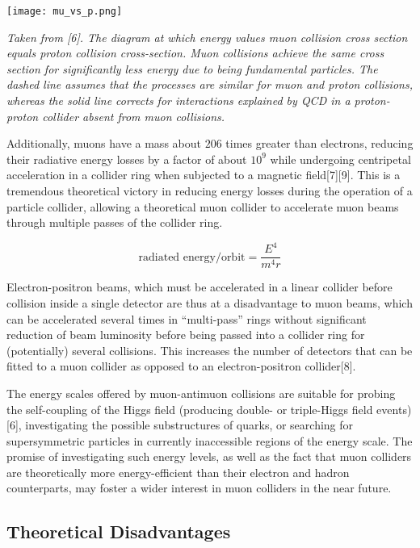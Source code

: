 \documentclass{article}
\begin{document}
	\begin{center}
		\texttt{[image: mu\_vs\_p.png]}
		\par \textit{Taken from [6]. The diagram at which energy values muon collision cross section equals proton collision cross-section. Muon collisions achieve the same cross section for significantly less energy due to being fundamental particles. The dashed line assumes that the processes are similar for muon and proton collisions, whereas the solid line corrects for interactions explained by QCD in a proton-proton collider absent from muon collisions.}
	\end{center}	
	
	
	\par Additionally, muons have a mass about $206$ times greater than electrons, reducing their radiative energy losses by a factor of about $10^{9}$ while undergoing centripetal acceleration in a collider ring when subjected to a magnetic field[7][9]. This is a tremendous theoretical victory in reducing energy losses during the operation of a particle collider, allowing a theoretical muon collider to accelerate muon beams through multiple passes of the collider ring. 
	
	$$\textrm{radiated energy/orbit} = \frac{E^4}{m^4r}$$
	
	\par Electron-positron beams, which must be accelerated in a linear collider before collision inside a single detector are thus at a disadvantage to muon beams, which can be accelerated several times in “multi-pass” rings without significant reduction of beam luminosity before being passed into a collider ring for (potentially) several collisions. This increases the number of detectors that can be fitted to a muon collider as opposed to an electron-positron collider[8].
	\par The energy scales offered by muon-antimuon collisions are suitable for probing the self-coupling of the Higgs field (producing double- or triple-Higgs field events)[6], investigating the possible substructures of quarks, or searching for supersymmetric particles in currently inaccessible regions of the energy scale. The promise of investigating such energy levels, as well as the fact that muon colliders are theoretically more energy-efficient than their electron and hadron counterparts, may foster a wider interest in muon colliders in the near future.
	
	
	\subsection{Theoretical Disadvantages}
	
\end{document}
